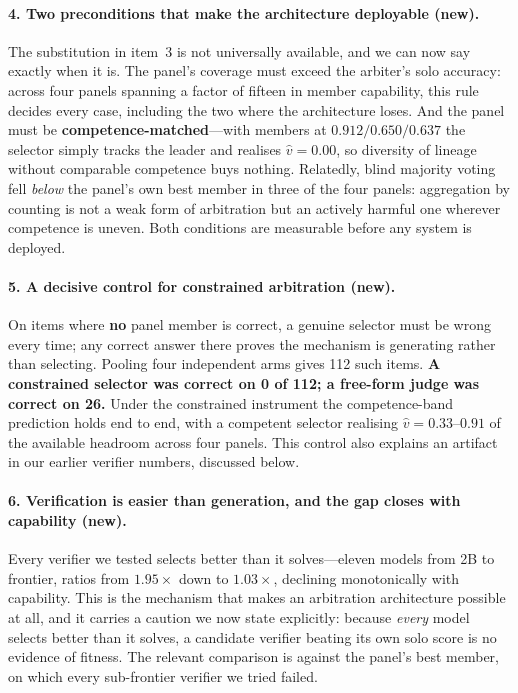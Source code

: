 \documentclass[11pt,a4paper]{article}
\begin{document}
\paragraph{4. Two preconditions that make the architecture deployable (new).}
The substitution in item~3 is not universally available, and we can now say exactly
when it is. The panel's coverage must exceed the arbiter's solo accuracy: across
four panels spanning a factor of fifteen in member capability, this rule decides
every case, including the two where the architecture loses. And the panel must be
\textbf{competence-matched}---with members at $0.912/0.650/0.637$ the selector simply
tracks the leader and realises $\hat v = 0.00$, so diversity of lineage without
comparable competence buys nothing. Relatedly, blind majority voting fell
\emph{below} the panel's own best member in three of the four panels: aggregation by
counting is not a weak form of arbitration but an actively harmful one wherever
competence is uneven. Both conditions are measurable before any system is deployed.

\paragraph{5. A decisive control for constrained arbitration (new).}
On items where \textbf{no} panel member is correct, a genuine selector must be wrong
every time; any correct answer there proves the mechanism is generating rather than
selecting. Pooling four independent arms gives 112 such items. \textbf{A constrained
selector was correct on 0 of 112; a free-form judge was correct on 26.} Under the
constrained instrument the competence-band prediction holds end to end, with a
competent selector realising $\hat v = 0.33$--$0.91$ of the available headroom across
four panels. This control also explains an artifact in our earlier verifier
numbers, discussed below.

\paragraph{6. Verification is easier than generation, and the gap closes with
capability (new).}
Every verifier we tested selects better than it solves---eleven models from 2B to
frontier, ratios from $1.95\times$ down to $1.03\times$, declining monotonically with
capability. This is the mechanism that makes an arbitration architecture possible at
all, and it carries a caution we now state explicitly: because \emph{every} model
selects better than it solves, a candidate verifier beating its own solo score is no
evidence of fitness. The relevant comparison is against the panel's best member, on
which every sub-frontier verifier we tried failed.
\end{document}
